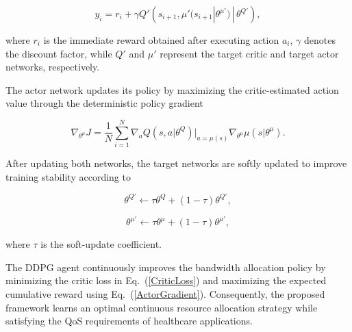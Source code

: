 \documentclass[10pt,journal,compsoc]{IEEEtran}
\begin{document}
\begin{equation}
\label{TargetValue}
y_i
=
r_i
+
\gamma
Q'
\left(
s_{i+1},
\mu'(s_{i+1}|\theta^{\mu'})
\,|\,
\theta^{Q'}
\right),
\end{equation}

where $r_i$ is the immediate reward obtained after executing action $a_i$, $\gamma$ denotes the discount factor, while $Q'$ and $\mu'$ represent the target critic and target actor networks, respectively.

The actor network updates its policy by maximizing the critic-estimated action value through the deterministic policy gradient \cite{tariq2025ddpgv2x}

\begin{equation}
\label{ActorGradient}
\nabla_{\theta^\mu}J
=
\frac{1}{N}
\sum_{i=1}^{N}
\nabla_a
Q(s,a|\theta^Q)
\Big|_{a=\mu(s)}
\nabla_{\theta^\mu}
\mu(s|\theta^\mu).
\end{equation}

After updating both networks, the target networks are softly updated to improve training stability according to \cite{tariq2025ddpgv2x}

\begin{equation}
\theta^{Q'}
\leftarrow
\tau\theta^{Q}
+
(1-\tau)\theta^{Q'},
\end{equation}

\begin{equation}
\theta^{\mu'}
\leftarrow
\tau\theta^{\mu}
+
(1-\tau)\theta^{\mu'},
\end{equation}

where $\tau$ is the soft-update coefficient.

The DDPG agent continuously improves the bandwidth allocation policy by minimizing the critic loss in Eq.~(\ref{CriticLoss}) and maximizing the expected cumulative reward using Eq.~(\ref{ActorGradient}). Consequently, the proposed framework learns an optimal continuous resource allocation strategy while satisfying the QoS requirements of healthcare applications.
\end{document}
